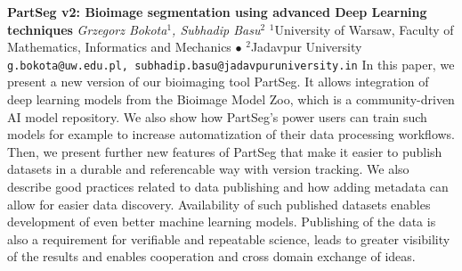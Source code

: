 
    \begin{conf-abstract}[]
        {\textbf{PartSeg v2: Bioimage segmentation using advanced Deep Learning techniques}}
        {\textit{Grzegorz Bokota$^{1}$, Subhadip Basu$^{2}$}}
        {$^{1}$University of Warsaw, Faculty of Mathematics, Informatics and Mechanics $\bullet$ $^{2}$Jadavpur University}
        {\texttt{g.bokota@uw.edu.pl, subhadip.basu@jadavpuruniversity.in}}
        {In this paper, we present a new version of our bioimaging tool PartSeg. It allows integration of deep learning models from the Bioimage Model Zoo, which is a community-driven AI model repository. We also show how PartSeg's power users can train such models for example to increase automatization of their data processing workflows.  Then, we present further new features of PartSeg that make it easier to publish datasets in a durable and referencable way with version tracking. We also describe good practices related to data publishing and how adding metadata can allow for easier data discovery. Availability of such published datasets enables development of even better machine learning models. Publishing of the data is also a requirement for verifiable and repeatable science, leads to greater visibility of the results and enables cooperation and cross domain exchange of ideas. }
    \end{conf-abstract}
        